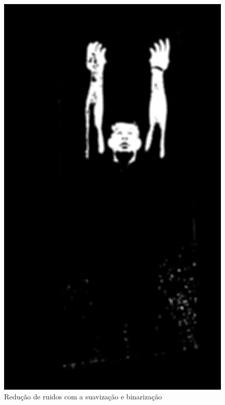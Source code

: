 \begin{figure}[H]
    \centering
    \caption{Redução de ruidos com a suavização e binarização}
        \begin{minipage}{\sizeImg\textwidth}
            \includegraphics[width=\textwidth]{figuras/mao_barra/blur.png}
        \end{minipage}
        \begin{minipage}{\sizeImg\textwidth}

\end{minipage}
\end{figure}
